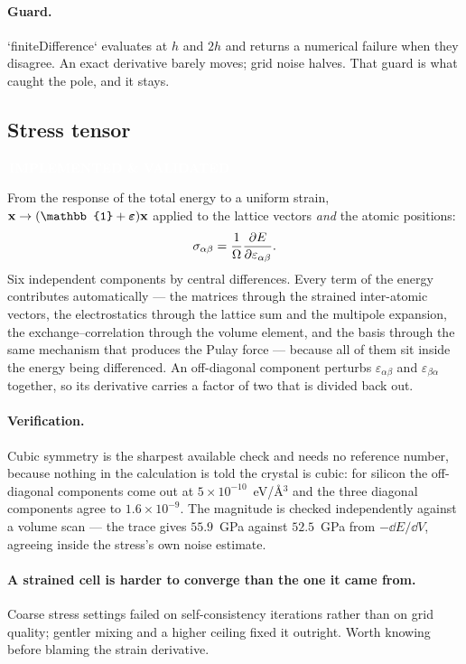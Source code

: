 \documentclass[11pt,a4paper]{article}
\newcommand{\badge}[2]{%
  \par\vspace{2pt}\noindent
  \colorbox{#1}{\textcolor{white}{\small\bfseries\,#2\,}}\par\vspace{4pt}}
\newcommand{\implemented}{\badge{okgreen}{IMPLEMENTED \& VALIDATED}}
\begin{document}
\paragraph{Guard.} `finiteDifference` evaluates at $h$ and $2h$ and returns a
numerical failure when they disagree. An exact derivative barely moves; grid
noise halves. That guard is what caught the pole, and it stays.

\subsection{Stress tensor}
\label{sec:stress}
\implemented

From the response of the total energy to a uniform strain, $\vb{x} \to
(\mathbb{1}+\bm{\varepsilon})\vb{x}$ applied to the lattice vectors
\emph{and} the atomic positions:
\begin{equation}
  \sigma_{\alpha\beta} = \frac{1}{\Omega}\pdv{E}{\varepsilon_{\alpha\beta}} .
\end{equation}
Six independent components by central differences. Every term of the energy
contributes automatically --- the matrices through the strained inter-atomic
vectors, the electrostatics through the lattice sum and the multipole
expansion, the exchange--correlation through the volume element, and the basis
through the same mechanism that produces the Pulay force --- because all of
them sit inside the energy being differenced. An off-diagonal component
perturbs $\varepsilon_{\alpha\beta}$ and $\varepsilon_{\beta\alpha}$ together,
so its derivative carries a factor of two that is divided back out.

\paragraph{Verification.} Cubic symmetry is the sharpest available check and
needs no reference number, because nothing in the calculation is told the
crystal is cubic: for silicon the off-diagonal components come out at
$5\times10^{-10}$~eV/\AA$^3$ and the three diagonal components agree to
$1.6\times10^{-9}$. The magnitude is checked independently against a volume
scan --- the trace gives $55.9$~GPa against $52.5$~GPa from $-\dd E/\dd V$,
agreeing inside the stress's own noise estimate.

\paragraph{A strained cell is harder to converge than the one it came from.}
Coarse stress settings failed on self-consistency iterations rather than on
grid quality; gentler mixing and a higher ceiling fixed it outright. Worth
knowing before blaming the strain derivative.
\end{document}
